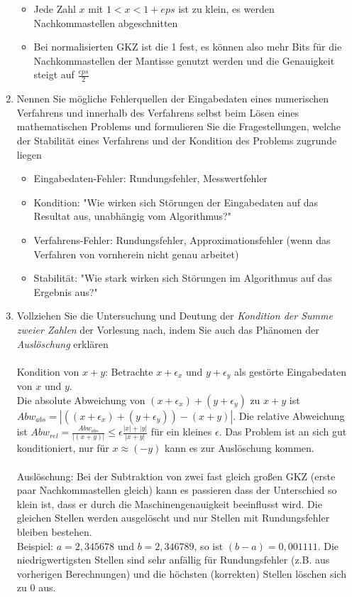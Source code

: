 \documentclass[]{article}
\begin{document}
\begin{enumerate}
\begin{itemize}
			\item Jede Zahl $x$ mit $1 < x < 1+eps$ ist zu klein, es werden Nachkommastellen abgeschnitten
			\item Bei normalisierten GKZ ist die 1 fest, es können also mehr Bits für die Nachkommastellen der Mantisse genutzt werden und die Genauigkeit steigt auf $\frac{eps}{2}$
		\end{itemize}
	\item Nennen Sie mögliche Fehlerquellen der Eingabedaten eines numerischen Verfahrens und innerhalb des Verfahrens selbst beim Lösen eines mathematischen Problems und formulieren Sie die Fragestellungen, welche der Stabilität eines Verfahrens und der Kondition des Problems zugrunde liegen
		\begin{itemize}
			\item Eingabedaten-Fehler: Rundungsfehler, Messwertfehler
			\item Kondition: "Wie wirken sich Störungen der Eingabedaten auf das Resultat aus, unabhängig vom Algorithmus?"
			\item Verfahrens-Fehler: Rundungsfehler, Approximationsfehler (wenn das Verfahren von vornherein nicht genau arbeitet)
			\item Stabilität: "Wie stark wirken sich Störungen im Algorithmus auf das Ergebnis aus?"
		\end{itemize}
	\item Vollziehen Sie die Untersuchung und Deutung der \textit{Kondition der Summe zweier Zahlen} der Vorlesung nach, indem Sie auch das Phänomen der \textit{Auslöschung} erklären \\
	\\
		Kondition von $x+y$: Betrachte $x+\epsilon_x$ und $y+\epsilon_y$ als gestörte Eingabedaten von $x$ und $y$. \\
		Die absolute Abweichung von $(x+\epsilon_x) + (y+\epsilon_y)$ zu $x+y$ ist $Abw_{abs} = |((x+\epsilon_x) + (y+\epsilon_y)) - (x+y)|$. Die relative Abweichung ist $Abw_{rel} = \frac{Abw_{abs}}{|(x+y)|} \leq \epsilon \frac{|x|+|y|}{|x+y|}$ für ein kleines $\epsilon$. Das Problem ist an sich gut konditioniert, nur für $x \approx (-y)$ kann es zur Auslöschung kommen.\\
	\\
		Auslöschung: Bei der Subtraktion von zwei fast gleich großen GKZ (erste paar Nachkommastellen gleich) kann es
		passieren dass der Unterschied so klein ist, dass er durch die Maschinengenauigkeit beeinflusst wird. Die gleichen Stellen werden ausgelöscht und nur Stellen mit Rundungsfehler bleiben bestehen.\\
	Beispiel: $a = 2,345678$ und $b = 2,346789$, so ist $(b-a) = 0,001111$. Die niedrigwertigsten Stellen sind sehr anfällig für Rundungsfehler (z.B. aus vorherigen Berechnungen) und die höchsten (korrekten) Stellen löschen sich zu $0$ aus.
\end{enumerate}
\end{document}
